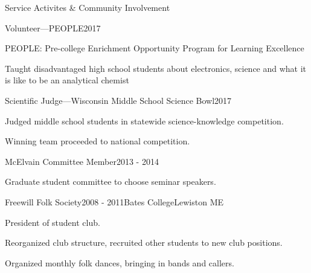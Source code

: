 \documentclass{resume}  %
\begin{document}
\begin{rSection}{Service Activites \& Community Involvement}
  \begin{rSubsection}{Volunteer---PEOPLE}{2017}{}{}
	  \item PEOPLE: Pre-college Enrichment Opportunity Program for Learning Excellence
	  \item Taught disadvantaged high school students about electronics, science and what it is like
      to be an analytical chemist
  \end{rSubsection}
  \begin{rSubsection}{Scientific Judge---Wisconsin Middle School Science Bowl}{2017}{}{}
    \item Judged middle school students in statewide science-knowledge competition.
    \item Winning team proceeded to national competition.
  \end{rSubsection}
  \begin{rSubsection}{McElvain Committee Member}{2013 - 2014}{}{}
    \item Graduate student committee to choose seminar speakers.
  \end{rSubsection}
  \begin{rSubsection}{Freewill Folk Society}{2008 - 2011}{Bates College}{Lewiston ME}
    \item President of student club.
    \item Reorganized club structure, recruited other students to new club positions.
    \item Organized monthly folk dances, bringing in bands and callers.
  \end{rSubsection}
\end{rSection}
\end{document}
